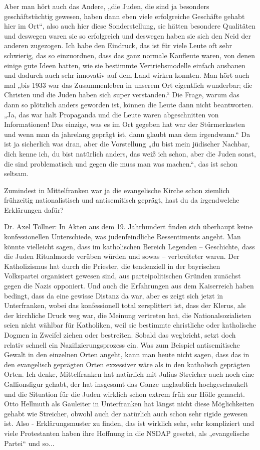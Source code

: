 Aber man hört auch das Andere, „die Juden, die sind ja besonders geschäftstüchtig gewesen, haben dann eben viele erfolgreiche Geschäfte gehabt hier im Ort“, also auch hier diese Sonderstellung, sie hätten besondere Qualitäten und deswegen waren sie so erfolgreich und deswegen haben sie sich den Neid der anderen zugezogen. Ich habe den Eindruck, das ist für viele Leute oft sehr schwierig, das so einzuordnen, dass das ganz normale Kaufleute waren, von denen einige gute Ideen hatten, wie sie bestimmte Vertriebsmodelle einfach ausbauen und dadurch auch sehr innovativ auf dem Land wirken konnten. 
Man hört auch mal „bis 1933 war das Zusammenleben in unserem Ort eigentlich wunderbar; die Christen und die Juden haben sich super verstanden.“ Die Frage, warum das dann so plötzlich anders geworden ist, können die Leute dann nicht beantworten. „Ja, das war halt Propaganda und die Leute waren abgeschnitten von Informationen! Das einzige, was es im Ort gegeben hat war der Stürmerkasten und wenn man da jahrelang geprägt ist, dann glaubt man dem irgendwann.“ 
Da ist ja sicherlich was dran, aber die Vorstellung „du bist mein jüdischer Nachbar, dich kenne ich, du bist natürlich anders, das weiß ich schon, aber die Juden sonst, die sind problematisch und gegen die muss man was machen.“, das ist schon seltsam. 

 
Zumindest in Mittelfranken war ja die evangelische Kirche schon ziemlich frühzeitig nationalistisch und antisemitisch geprägt, hast du da irgendwelche Erklärungen dafür? 

Dr. Axel Töllner: In Akten aus dem 19. Jahrhundert finden sich überhaupt keine konfessionellen Unterschiede, was judenfeindliche Ressentiments angeht. Man könnte vielleicht sagen, dass im katholischen Bereich Legenden – Geschichte, dass die Juden Ritualmorde verüben würden und sowas – verbreiteter waren. 
Der Katholizismus hat durch die Priester, die tendenziell in der bayrischen Volkspartei organisiert gewesen sind, aus parteipolitischen Gründen zunächst gegen die Nazis opponiert. Und auch die Erfahrungen aus dem Kaiserreich haben bedingt, dass da eine gewisse Distanz da war, aber es zeigt sich jetzt in Unterfranken, wobei das konfessionell total zersplittert ist, dass der Klerus, als der kirchliche Druck weg war, die Meinung vertreten hat, die Nationalsozialisten seien nicht wählbar für Katholiken, weil sie bestimmte christliche oder katholische Dogmen in Zweifel ziehen oder bestreiten. Sobald das wegbricht, setzt doch relativ schnell ein Nazifizierungsprozess ein. Was zum Beispiel antisemitische Gewalt in den einzelnen Orten angeht, kann man heute nicht sagen, dass das in den evangelisch geprägten Orten exzessiver wäre als in den katholisch geprägten Orten. Ich denke, Mittelfranken hat natürlich mit Julius Streicher auch noch eine Gallionsfigur gehabt, der hat insgesamt das Ganze unglaublich hochgeschaukelt und die Situation für die Juden wirklich schon extrem früh zur Hölle gemacht. Otto Hellmuth als Gauleiter in Unterfranken hat längst nicht diese Möglichkeiten gehabt wie Streicher, obwohl auch der natürlich auch schon sehr rigide gewesen ist.  
Also - Erklärungsmuster zu finden, das ist wirklich sehr, sehr kompliziert und viele Protestanten haben ihre Hoffnung in die NSDAP gesetzt, als „evangelische Partei“ und so... 

